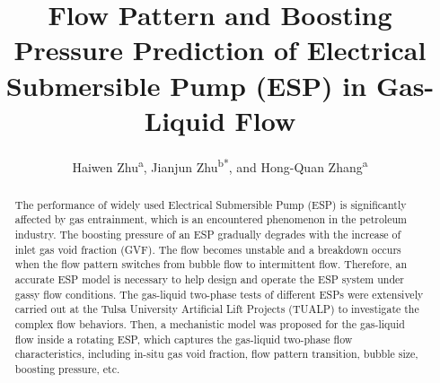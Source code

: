 \documentclass[preprint,12pt]{elsarticle}
\begin{document}
\begin{frontmatter}


\title{Flow Pattern and Boosting Pressure Prediction of Electrical Submersible Pump (ESP) in Gas-Liquid Flow}




\author{Haiwen Zhu\textsuperscript{a}, Jianjun Zhu\textsuperscript{b*}, and Hong-Quan Zhang\textsuperscript{a}}
\address{a McDougall School of Petroleum Engineering, The University of Tulsa, 800 S Tucker Dr, Tulsa, OK, 74104}
\address{b College of Mechanical and Transportation Engineering, China University of Petroleum-Beijing, Beijing, 102249, China}
\begin{abstract}
    \sloppy{}
The performance of widely used Electrical Submersible Pump (ESP) is significantly affected by gas entrainment, which is an encountered phenomenon in the petroleum industry. The boosting pressure of an ESP gradually degrades with the increase of inlet gas void fraction (GVF). The flow becomes unstable and a breakdown occurs when the flow pattern switches from bubble flow to intermittent flow. Therefore, an accurate ESP model is necessary to help design and operate the ESP system under gassy flow conditions. The gas-liquid two-phase tests of different ESPs were extensively carried out at the Tulsa University Artificial Lift Projects (TUALP) to investigate the complex flow behaviors. Then, a mechanistic model was proposed for the gas-liquid flow inside a rotating ESP, which captures the gas-liquid two-phase flow characteristics, including in-situ gas void fraction, flow pattern transition, bubble size, boosting pressure, etc. 


\end{abstract}
\end{frontmatter}
\end{document}
